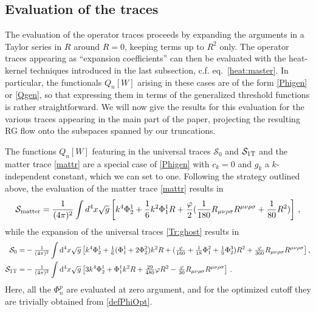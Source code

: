 \documentclass[preprint,preprintnumbers,amsmath,amssymb,nofootinbib,APS]{revtex4}
\newcommand{\be}{\begin{equation}}
\newcommand{\ee}{\end{equation}}
\newcommand{\cS}{\mathcal{S}}
\newcommand{\2}{\sqrt{2\,}}
\newcommand{\rmd}{{\rm d}}
\begin{document}
\begin{appendix}
\subsection{Evaluation of the traces}
\label{App:C2}
%
The evaluation of the operator traces proceeds by expanding the arguments in a Taylor series in $R$ around $R=0$, keeping terms up to $R^2$ only. The operator
traces appearing as ``expansion coefficients'' can then be evaluated with the heat-kernel techniques introduced in the last subsection, c.f. eq.\ \eqref{heat:master}.
In particular, the functionals $Q_n[W]$ arising in these cases are of the form \eqref{Phigen} or \eqref{Qgen}, so that expressing them in terms of the generalized threshold functions is rather straightforward. We will now give the results for this evaluation for the various traces appearing in the main part of the paper, projecting the resulting RG flow onto the subspaces spanned by our truncations.

The functions $Q_n[W]$ featuring in the universal traces $\cS_0$ and $\cS_{\rm 1T}$ and the matter trace \eqref{mattr} are a special case of \eqref{Phigen} with $c_k = 0$ and $g_k$ a $k$-independent constant, which we can set to one. Following the strategy outlined above, the evaluation of the matter trace \eqref{mattr} results in
%
\be\label{mattercont}
\cS_{\rm matter} = \frac{1}{(4\pi)^2} \int d^4x \sqrt{g} \left[ k^4 \Phi^1_2 + \frac{1}{6} k^2 \Phi^1_1 R + \frac{\varphi}{2} (\frac{1}{180} R_{\mu\nu\rho\sigma} R^{\mu\nu\rho \sigma} + \frac{1}{80} R^2 ) \right] \, ,
\ee
%
while the  expansion of the universal traces \eqref{Tr:ghost} results in  
\be\label{eq:TRuni}
\begin{split}
\cS_0 = & - \tfrac{1}{(4\pi)^2} \int \rmd^4x\sqrt{g}
\left[ k^4 \Phi^1_2 + \tfrac{1}{6} (\Phi^1_1 + 2 \Phi^2_2 ) k^2 R  
+ (\tfrac{\varphi}{160} + \tfrac{1}{18} \Phi^2_1 + \tfrac{1}{9} \Phi^3_2 ) R^2 + 
\tfrac{\varphi}{360} R_{\mu\nu\rho\sigma} R^{\mu\nu\rho\sigma}
\right], \\
\cS_{\rm 1T} = & - \tfrac{1}{(4\pi)^2} \int \rmd^4x\sqrt{g}
\left[ 3 k^4 \Phi^1_2 + \Phi^1_1 k^2 R + \tfrac{29}{480} \varphi R^2 - \tfrac{\varphi}{30} R_{\mu\nu\rho\sigma} R^{\mu\nu\rho\sigma} \right] \, .
\end{split}
\ee
%
Here, all the $\Phi^p_n$ are evaluated at zero argument, and for the optimized cutoff they are trivially obtained from \eqref{defPhiOpt}.


\end{appendix}
\end{document}
